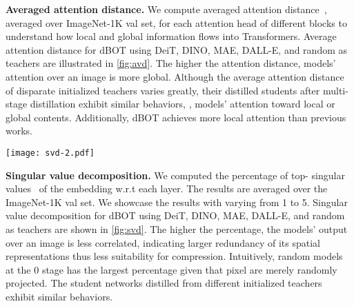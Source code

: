 \documentclass[10pt,twocolumn,letterpaper]{article}
\renewcommand{\paragraph}[1]{\vspace{1.25mm}\noindent\textbf{#1}}
\def\ourmethod{{dBOT}\xspace}
\begin{document}
\paragraph{Averaged attention distance.}
We compute averaged attention distance~\cite{vit}, averaged over ImageNet-1K val set, for each attention head of different blocks to understand how local and global information flows into Transformers. 
Average attention distance for \ourmethod using DeiT, DINO, MAE, DALL-E, and random as teachers are illustrated in \cref{fig:avd}.
The higher the attention distance, models' attention over an image is more global.
Although the average attention distance of disparate initialized teachers varies greatly, their distilled students after multi-stage distillation exhibit similar behaviors, \eg, models' attention toward local or global contents.
Additionally, \ourmethod achieves more local attention than previous works.



\begin{figure*}[ht]
  \centering
  \texttt{[image: svd-2.pdf]}
  \caption{Singular value decomposition of different layers of ViT-B with different distilling teachers and their corresponding student distilled for 2 stages. The first row showcases the teachers while the second showcases the 2 stage distilled student. Models using different teachers achieve the same result.}
  \label{fig:svd}
\end{figure*}







\paragraph{Singular value decomposition.}
We computed the percentage of top- singular values~\cite{svd} of the embedding w.r.t each layer. The results are averaged over the ImageNet-1K val set. We showcase the results with  varying from 1 to 5. 
Singular value decomposition for \ourmethod using DeiT, DINO, MAE, DALL-E, and random as teachers are shown in \cref{fig:svd}.
The higher the percentage, the models' output over an image is less correlated, indicating larger redundancy of its spatial representations thus less suitability for compression. Intuitively, random models at the 0 stage has the largest percentage given that pixel are merely randomly projected.
The student networks distilled from different initialized teachers exhibit similar behaviors.
\end{document}
